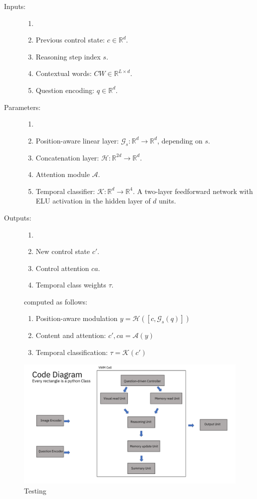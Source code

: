 \documentclass{article}
\theoremstyle{remark}
\theoremstyle{definition}
\newcommand{\Reals}{\mathbb{R}}
\newcommand{\cA}{\mathcal{A}}
\newcommand{\cG}{\mathcal{G}}
\newcommand{\cK}{\mathcal{K}}
\newcommand{\cH}{\mathcal{H}}
\begin{document}
\begin{description}
	\item[Inputs:] 
	\begin{enumerate}
		\item[]
		\item Previous control state: $c \in \Reals^d$.	
		\item Reasoning step index $s$.
		\item Contextual words: $CW \in \Reals^{L \times d}$.
		\item Question encoding: $q \in \Reals^d$.
	\end{enumerate}
	
	\item[Parameters:] 
	\begin{enumerate}
		\item[]
		\item Position-aware linear layer: $\cG_s: \Reals^d \to \Reals^d$, depending on $s$.
		\item Concatenation layer: $\cH: \Reals^{2d} \to \Reals^d$.
		\item Attention module $\cA$.
		\item Temporal classifier:  $\cK: \Reals^d \to \Reals^4$. A two-layer feedforward
		network with ELU activation in the hidden layer of $d$ units.	
	\end{enumerate}
	
	\item[Outputs:] 
	\begin{enumerate}
		\item[]
		\item New control state $c'$.
		\item Control attention $ca$.
		\item Temporal class weights $\tau$.
	\end{enumerate}
	computed as follows:
	\begin{enumerate}[label=\alph*.]
		\item Position-aware modulation $y = \cH([c, \cG_s(q)])$
		\item Content and attention: $c', ca = \cA(y)$
		\item Temporal classification: $\tau = \cK(c')$
	\end{enumerate}
\end{description}


\begin{figure}[b]
	\centering
	\includegraphics[width=\textwidth]{img/model}
	\caption{Testing}
	\label{fig:model}
\end{figure}
\end{document}
